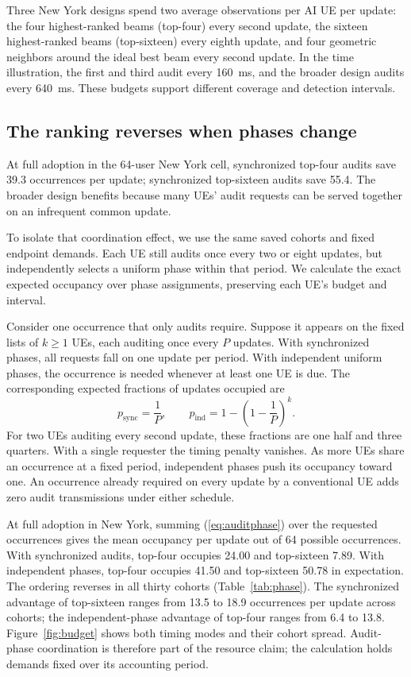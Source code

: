 \documentclass[journal,10pt]{IEEEtran}
\begin{document}
Three New York designs spend two average observations per AI UE per update: the four highest-ranked beams (top-four) every second update, the sixteen highest-ranked beams (top-sixteen) every eighth update, and four geometric neighbors around the ideal best beam every second update. In the time illustration, the first and third audit every 160~ms, and the broader design audits every 640~ms. These budgets support different coverage and detection intervals.

\subsection{The ranking reverses when phases change}
At full adoption in the 64-user New York cell, synchronized top-four audits save 39.3 occurrences per update; synchronized top-sixteen audits save 55.4. The broader design benefits because many UEs' audit requests can be served together on an infrequent common update.

To isolate that coordination effect, we use the same saved cohorts and fixed endpoint demands. Each UE still audits once every two or eight updates, but independently selects a uniform phase within that period. We calculate the exact expected occupancy over phase assignments, preserving each UE's budget and interval.

Consider one occurrence that only audits require. Suppose it appears on the fixed lists of $k\geq 1$ UEs, each auditing once every $P$ updates. With synchronized phases, all requests fall on one update per period. With independent uniform phases, the occurrence is needed whenever at least one UE is due. The corresponding expected fractions of updates occupied are
\begin{equation}
  p_{\mathrm{sync}}=\frac{1}{P}, \qquad
  p_{\mathrm{ind}}=1-\left(1-\frac{1}{P}\right)^{k}.
  \label{eq:auditphase}
\end{equation}
For two UEs auditing every second update, these fractions are one half and three quarters. With a single requester the timing penalty vanishes. As more UEs share an occurrence at a fixed period, independent phases push its occupancy toward one. An occurrence already required on every update by a conventional UE adds zero audit transmissions under either schedule.

At full adoption in New York, summing (\ref{eq:auditphase}) over the requested occurrences gives the mean occupancy per update out of 64 possible occurrences. With synchronized audits, top-four occupies 24.00 and top-sixteen 7.89. With independent phases, top-four occupies 41.50 and top-sixteen 50.78 in expectation. The ordering reverses in all thirty cohorts (Table~\ref{tab:phase}). The synchronized advantage of top-sixteen ranges from 13.5 to 18.9 occurrences per update across cohorts; the independent-phase advantage of top-four ranges from 6.4 to 13.8. Figure~\ref{fig:budget} shows both timing modes and their cohort spread. Audit-phase coordination is therefore part of the resource claim; the calculation holds demands fixed over its accounting period.
\end{document}
